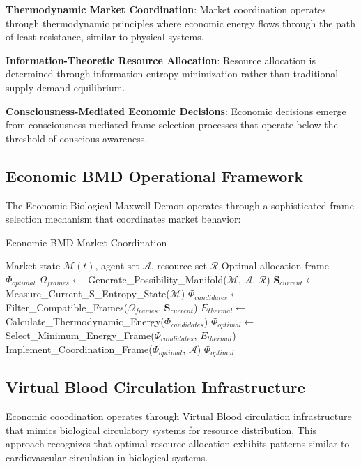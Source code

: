 \documentclass[12pt,a4paper]{article}
\begin{document}
\textbf{Thermodynamic Market Coordination}: Market coordination operates through thermodynamic principles where economic energy flows through the path of least resistance, similar to physical systems.

\textbf{Information-Theoretic Resource Allocation}: Resource allocation is determined through information entropy minimization rather than traditional supply-demand equilibrium.

\textbf{Consciousness-Mediated Economic Decisions}: Economic decisions emerge from consciousness-mediated frame selection processes that operate below the threshold of conscious awareness.

\subsection{Economic BMD Operational Framework}

The Economic Biological Maxwell Demon operates through a sophisticated frame selection mechanism that coordinates market behavior:

\begin{algorithm}
\caption{Economic BMD Market Coordination}
\begin{algorithmic}[1]
\Require Market state $\mathcal{M}(t)$, agent set $\mathcal{A}$, resource set $\mathcal{R}$
\Ensure Optimal allocation frame $\Phi_{optimal}$
\State $\Omega_{frames} \leftarrow$ Generate\_Possibility\_Manifold($\mathcal{M}$, $\mathcal{A}$, $\mathcal{R}$)
\State $\mathbf{S}_{current} \leftarrow$ Measure\_Current\_S\_Entropy\_State($\mathcal{M}$)
\State $\Phi_{candidates} \leftarrow$ Filter\_Compatible\_Frames($\Omega_{frames}$, $\mathbf{S}_{current}$)
\State $E_{thermal} \leftarrow$ Calculate\_Thermodynamic\_Energy($\Phi_{candidates}$)
\State $\Phi_{optimal} \leftarrow$ Select\_Minimum\_Energy\_Frame($\Phi_{candidates}$, $E_{thermal}$)
\State Implement\_Coordination\_Frame($\Phi_{optimal}$, $\mathcal{A}$)
\Return $\Phi_{optimal}$
\end{algorithmic}
\end{algorithm}

\subsection{Virtual Blood Circulation Infrastructure}

Economic coordination operates through Virtual Blood circulation infrastructure that mimics biological circulatory systems for resource distribution. This approach recognizes that optimal resource allocation exhibits patterns similar to cardiovascular circulation in biological systems.
\end{document}
